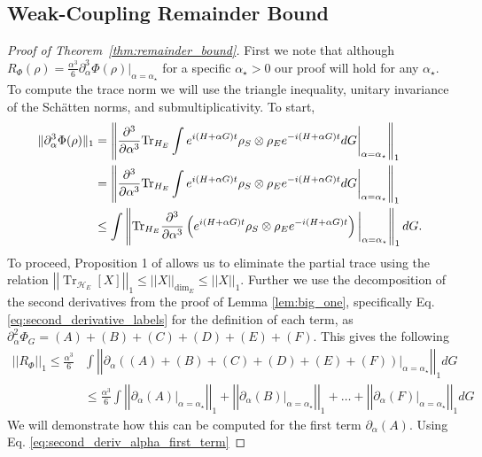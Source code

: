 \documentclass{article}
\newcommand{\brackets}[1]{\left[ #1 \right]}
\newcommand{\norm}[1]{\left|\left| #1 \right|\right|}
\DeclareMathOperator{\Tr}{Tr}
\newcommand{\partrace}[2]{\Tr_{#1} \brackets{ #2 }}
\newcommand{\hilb}{\mathcal{H}}
\begin{document}
\subsection{Weak-Coupling Remainder Bound} \label{sec:weak_coupling_remainder_bound}

\begin{proof}[Proof of Theorem~\ref{thm:remainder_bound}]
First we note that although $R_{\Phi}(\rho) = \frac{\alpha^3}{6} \partial_{\alpha}^3 \Phi(\rho)\big|_{\alpha = \alpha_{\star}}$ for a specific $ \alpha_{\star} > 0$ our proof will hold for any $\alpha_{\star}$. To compute the trace norm we will use the triangle inequality, unitary invariance of the Sch\"{a}tten norms, and submultiplicativity. To start,
\begin{align}
    \|\partial_\alpha^3 \Phi(\rho) \|_1 &= \left\| \frac{\partial^3}{\partial \alpha^3} {\rm Tr}_{H_E} \int e^{i(H+\alpha G)t} \rho_S \otimes \rho_E e^{-i(H+\alpha G)t} dG \bigg|_{\alpha = \alpha_{\star}} \right\|_1 \nonumber\\
    &= \left\| \frac{\partial^3}{\partial \alpha^3} {\rm Tr}_{H_E} \int e^{i(H+\alpha G)t} \rho_S \otimes \rho_E e^{-i(H+\alpha G)t} dG \bigg|_{\alpha = \alpha_{\star}} \right\|_1 \nonumber\\
    &\le    \int \left\|{\rm Tr}_{H_E}\frac{\partial^3}{\partial \alpha^3}\left( e^{i(H+\alpha G)t} \rho_S \otimes \rho_E e^{-i(H+\alpha G)t}\right) \bigg|_{\alpha = \alpha_{\star}} \right\|_1 dG.\label{eq:3derivBd}
\end{align}
To proceed, Proposition 1 of \cite{rastegin2012relations} allows us to eliminate the partial trace using the relation
$\norm{\partrace{\hilb_E}{X}}_{1} \le \norm{X}_{\dim_E} \le \norm{X}_1$. Further we use the decomposition of the second derivatives from the proof of Lemma \ref{lem:big_one}, specifically  Eq. \eqref{eq:second_derivative_labels} for the definition of each term, as $\partial_{\alpha}^2 \Phi_G = (A) + (B) + (C) + (D) +(E) + (F)$. This gives the following 
\begin{align}
    \norm{R_{\Phi}}_1 \le \frac{\alpha^3}{6} &\int \norm{\partial_{\alpha}((A) + (B) + (C) + (D) +(E) + (F)) \big|_{\alpha = \alpha_{\star}} }_1 dG \\
    &\le \frac{\alpha^3}{6} \int \norm{\partial_{\alpha}(A)\big|_{\alpha = \alpha_{\star}} }_1 + \norm{\partial_{\alpha}(B) \big|_{\alpha = \alpha_{\star}} }_1 + \ldots + \norm{\partial_{\alpha}(F) \big|_{\alpha = \alpha_{\star}} }_1 dG
\end{align}
We will demonstrate how this can be computed for the first term $\partial_{\alpha}(A)$. Using Eq. \ref{eq:second_deriv_alpha_first_term}

\end{proof}
\end{document}
